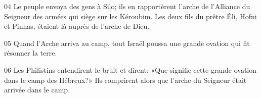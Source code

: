 
04 Le peuple envoya des gens à Silo; ils en rapportèrent l’arche de l’Alliance du Seigneur des armées qui siège sur les Kéroubim. Les deux fils du prêtre Éli, Hofni et Pinhas, étaient là auprès de l’arche de Dieu.

05 Quand l’Arche arriva au camp, tout Israël poussa une grande ovation qui fit résonner la terre.

06 Les Philistins entendirent le bruit et dirent: «Que signifie cette grande ovation dans le camp des Hébreux?» Ils comprirent alors que l’arche du Seigneur était arrivée dans le camp.
